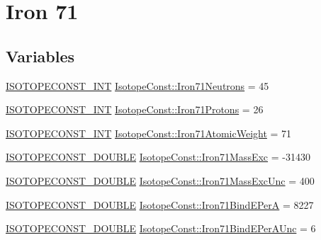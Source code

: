 \hypertarget{group___isotope_const-_iron-_fe71}{}\section{Iron 71}
\label{group___isotope_const-_iron-_fe71}
\subsection*{Variables}
\begin{DoxyCompactItemize}
\item 
\mbox{\hyperlink{group___isotope_const-_macros_ga5f18360b3e99483a35c32d789e62621c}{I\+S\+O\+T\+O\+P\+E\+C\+O\+N\+S\+T\+\_\+\+I\+NT}} \mbox{\hyperlink{group___isotope_const-_iron-_fe71_ga68a3670bb02cc0b198e5baae7db71d6c}{Isotope\+Const\+::\+Iron71\+Neutrons}} = 45
\item 
\mbox{\hyperlink{group___isotope_const-_macros_ga5f18360b3e99483a35c32d789e62621c}{I\+S\+O\+T\+O\+P\+E\+C\+O\+N\+S\+T\+\_\+\+I\+NT}} \mbox{\hyperlink{group___isotope_const-_iron-_fe71_gaed7dd4adbe5ab34cea597bccb1f4f23f}{Isotope\+Const\+::\+Iron71\+Protons}} = 26
\item 
\mbox{\hyperlink{group___isotope_const-_macros_ga5f18360b3e99483a35c32d789e62621c}{I\+S\+O\+T\+O\+P\+E\+C\+O\+N\+S\+T\+\_\+\+I\+NT}} \mbox{\hyperlink{group___isotope_const-_iron-_fe71_ga04bfc085dbff0a393e325e36c5e6f60a}{Isotope\+Const\+::\+Iron71\+Atomic\+Weight}} = 71
\item 
\mbox{\hyperlink{group___isotope_const-_macros_ga8f45a7272ce02c0b4c65c44636ed719a}{I\+S\+O\+T\+O\+P\+E\+C\+O\+N\+S\+T\+\_\+\+D\+O\+U\+B\+LE}} \mbox{\hyperlink{group___isotope_const-_iron-_fe71_ga03bee0545bc6f9c6bef222376d8a5381}{Isotope\+Const\+::\+Iron71\+Mass\+Exc}} = -\/31430
\item 
\mbox{\hyperlink{group___isotope_const-_macros_ga8f45a7272ce02c0b4c65c44636ed719a}{I\+S\+O\+T\+O\+P\+E\+C\+O\+N\+S\+T\+\_\+\+D\+O\+U\+B\+LE}} \mbox{\hyperlink{group___isotope_const-_iron-_fe71_ga222dffc60a46a9fedb1e9046a21a53c9}{Isotope\+Const\+::\+Iron71\+Mass\+Exc\+Unc}} = 400
\item 
\mbox{\hyperlink{group___isotope_const-_macros_ga8f45a7272ce02c0b4c65c44636ed719a}{I\+S\+O\+T\+O\+P\+E\+C\+O\+N\+S\+T\+\_\+\+D\+O\+U\+B\+LE}} \mbox{\hyperlink{group___isotope_const-_iron-_fe71_ga1e8de04f1b2c53a3c84db01019f70242}{Isotope\+Const\+::\+Iron71\+Bind\+E\+PerA}} = 8227
\item 
\mbox{\hyperlink{group___isotope_const-_macros_ga8f45a7272ce02c0b4c65c44636ed719a}{I\+S\+O\+T\+O\+P\+E\+C\+O\+N\+S\+T\+\_\+\+D\+O\+U\+B\+LE}} \mbox{\hyperlink{group___isotope_const-_iron-_fe71_gaa37c5497a142a274f3675b3d53797a78}{Isotope\+Const\+::\+Iron71\+Bind\+E\+Per\+A\+Unc}} = 6

\end{DoxyCompactItemize}
